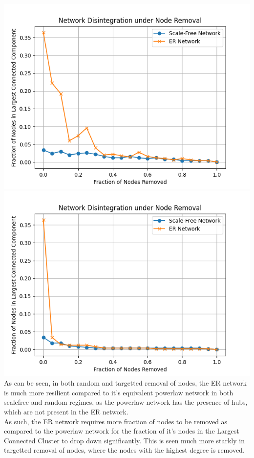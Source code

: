 \documentclass[11pt]{article}
\begin{document}
\includegraphics[scale=0.5]{rnrrand.png} \includegraphics[scale=0.5]{tnrrand.png}\\
As can be seen, in both random and targetted removal of nodes, the ER network is much more resilient compared to it's equivalent powerlaw network in both scalefree and random regimes, as the powerlaw network has the presence of hubs, which are not present in the ER network.\\
As such, the ER network requires more fraction of nodes to be removed as compared to the powerlaw network for the fraction of it's nodes in the Largest Connected Cluster to drop down significantly. This is seen much more starkly in targetted removal of nodes, where the nodes with the highest degree is removed.
\end{document}
